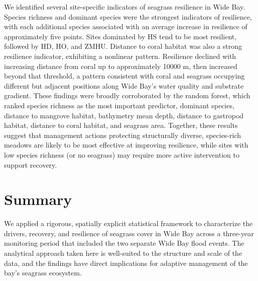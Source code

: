 \documentclass[
  letterpaper,
  DIV=11,
  numbers=noendperiod]{scrartcl}
\begin{document}
We identified several site-specific indicators of seagrass resilience in
Wide Bay. Species richness and dominant species were the strongest
indicators of resilience, with each additional species associated with
an average increase in resilience of approximately five points. Sites
dominated by HS tend to be most resilient, followed by HD, HO, and ZMHU.
Distance to coral habitat was also a strong resilience indicator,
exhibiting a nonlinear pattern. Resilience declined with increasing
distance from coral up to approximately 10000 m, then increased beyond
that threshold, a pattern consistent with coral and seagrass occupying
different but adjacent positions along Wide Bay's water quality and
substrate gradient. These findings were broadly corroborated by the
random forest, which ranked species richness as the most important
predictor, dominant species, distance to mangrove habitat, bathymetry
mean depth, distance to gastropod habitat, distance to coral habitat,
and seagrass area. Together, these results suggest that management
actions protecting structurally diverse, species-rich meadows are likely
to be most effective at improving resilience, while sites with low
species richness (or no seagrass) may require more active intervention
to support recovery.

\section{Summary}\label{summary}

We applied a rigorous, spatially explicit statistical framework to
characterize the drivers, recovery, and resilience of seagrass cover in
Wide Bay across a three-year monitoring period that included the two
separate Wide Bay flood events. The analytical approach taken here is
well-suited to the structure and scale of the data, and the findings
have direct implications for adaptive management of the bay's seagrass
ecosystem.
\end{document}
